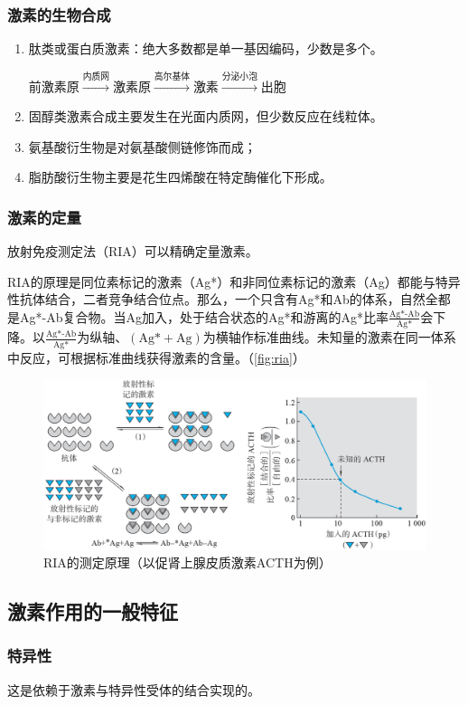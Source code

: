 \subsubsection{激素的生物合成}

\begin{enumerate}
	\item 肽类或蛋白质激素：绝大多数都是单一基因编码，少数是多个。

	前激素原$\xrightarrow{\text{内质网}}$激素原$\xrightarrow{\text{高尔基体}}$激素$\xrightarrow{\text{分泌小泡}}$出胞
	\item 固醇类激素合成主要发生在光面内质网，但少数反应在线粒体。
	\item 氨基酸衍生物是对氨基酸侧链修饰而成；
	\item 脂肪酸衍生物主要是花生四烯酸在特定酶催化下形成。
\end{enumerate}

\subsubsection{激素的定量}

放射免疫测定法（RIA）可以精确定量激素。

RIA的原理是同位素标记的激素（Ag*）和非同位素标记的激素（Ag）都能与特异性抗体结合，二者竞争结合位点。那么，一个只含有Ag*和Ab的体系，自然全都是Ag*-Ab复合物。当Ag加入，处于结合状态的Ag*和游离的Ag*比率$\displaystyle\frac{\text{Ag*-Ab}}{\text{Ag*}}$会下降。以$\displaystyle\frac{\text{Ag*-Ab}}{\text{Ag*}}$为纵轴、$(\text{Ag*}+\text{Ag})$为横轴作标准曲线。未知量的激素在同一体系中反应，可根据标准曲线获得激素的含量。（\autoref{fig:ria}）

\begin{figure}[h]
	\centering
	\includegraphics[width=\textwidth]{Pics/RIA}
	\caption{RIA的测定原理（以促肾上腺皮质激素ACTH为例）}
	\label{fig:ria}
\end{figure}

\subsection{激素作用的一般特征}

\subsubsection{特异性}

这是依赖于激素与特异性受体的结合实现的。

